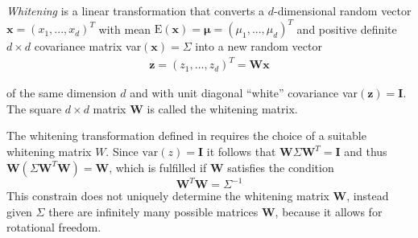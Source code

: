 \textit{Whitening} is a linear transformation that converts a $d$-dimensional
random vector $\mathbf{x} = (x_1,...,x_d)^T$ with mean
$\text{E}(\mathbf{x}) = \mathbf{\mu} = (\mu_1,...,\mu_d)^T$ and
positive definite $d \times d$ covariance matrix
var$(\mathbf{x}) = \Sigma$ into a new random vector
\begin{align}
  \label{whitening}
 \mathbf{z} = (z_1,...,z_d)^T = \mathbf{W}\mathbf{x}
\end{align}

of the same dimension $d$ and with unit diagonal ``white'' covariance
var$(\mathbf{z}) = \mathbf{I}$. The square $d \times d$
matrix $\mathbf{W}$ is called the whitening matrix.

The whitening transformation defined in  requires
the choice of a suitable whitening matrix $W$.
Since $\text{var}(z) = \mathbf{I}$ it follows that
$\mathbf{W}\Sigma \mathbf{W}^T = \mathbf{I}$ and thus
$\mathbf{W}(\Sigma \mathbf{W}^T\mathbf{W}) = \mathbf{W}$, which
is fulfilled if $\mathbf{W}$ satisfies the condition
$$ \mathbf{W}^T \mathbf{W} = \Sigma^{-1} $$
This constrain does not uniquely determine the whitening
matrix $\mathbf{W}$, instead given $\Sigma$ there are infinitely many
possible matrices $\mathbf{W}$, because it allows for rotational freedom.



